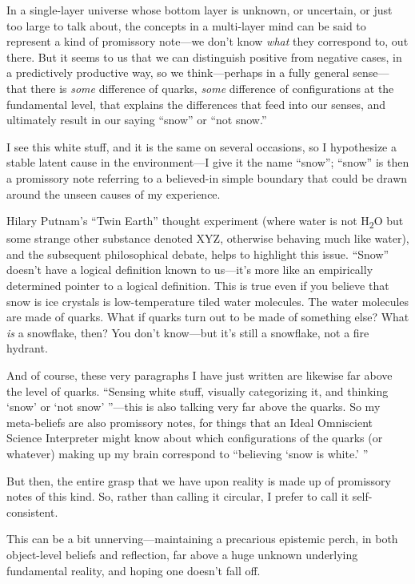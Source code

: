 {
 In a single-layer universe whose bottom layer is unknown, or
uncertain, or just too large to talk about, the concepts in a
multi-layer mind can be said to represent a kind of promissory
note---we don't know \textit{what} they correspond to,
out there. But it seems to us that we can distinguish positive from
negative cases, in a predictively productive way, so we think---perhaps
in a fully general sense---that there is \textit{some} difference of
quarks, \textit{some} difference of configurations at the fundamental
level, that explains the differences that feed into our senses, and
ultimately result in our saying
``snow'' or ``not
snow.''}

{
 I see this white stuff, and it is the same on several occasions,
so I hypothesize a stable latent cause in the environment---I give it
the name ``snow'';
``snow'' is then a promissory note
referring to a believed-in simple boundary that could be drawn around
the unseen causes of my experience.}

{
 Hilary Putnam's ``Twin
Earth'' thought experiment (where water is not
H\textsubscript{2}O but some strange other substance denoted XYZ,
otherwise behaving much like water), and the subsequent philosophical
debate, helps to highlight this issue.
``Snow'' doesn't
have a logical definition known to us---it's more like
an empirically determined pointer to a logical definition. This is true
even if you believe that snow is ice crystals is low-temperature tiled
water molecules. The water molecules are made of quarks. What if quarks
turn out to be made of something else? What \textit{is} a snowflake,
then? You don't know---but it's still a
snowflake, not a fire hydrant.}

{
 And of course, these very paragraphs I have just written are
likewise far above the level of quarks. ``Sensing
white stuff, visually categorizing it, and thinking
`snow' or `not
snow' ''---this is also talking very
far above the quarks. So my meta-beliefs are also promissory notes, for
things that an Ideal Omniscient Science Interpreter might know about
which configurations of the quarks (or whatever) making up my brain
correspond to ``believing `snow is
white.' ''}

{
 But then, the entire grasp that we have upon reality is made up of
promissory notes of this kind. So, rather than calling it circular, I
prefer to call it self-consistent.}

{
 This can be a bit unnerving---maintaining a precarious epistemic
perch, in both object-level beliefs and reflection, far above a huge
unknown underlying fundamental reality, and hoping one
doesn't fall off.}

